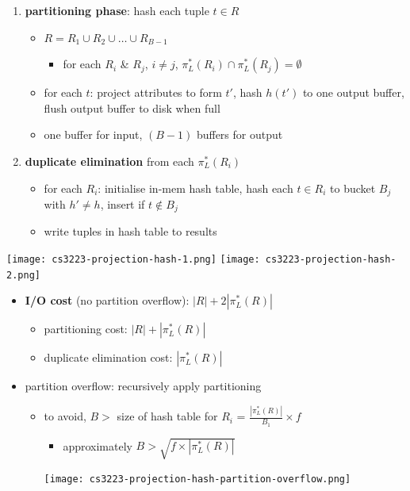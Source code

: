 \documentclass[10pt, landscape]{article}
\begin{document}
\begin{multicols*}{4}
  \begin{enumerate}
    \item \textbf{partitioning phase}: hash each tuple $t \in R$ 
      \begin{itemize}
        \item $R = R_1 \cup R_2 \cup \dots \cup R_{B-1}$
          \begin{itemize}
            \item for each $R_i$ \& $R_j$, $i \neq j$, $\pi_L^*(R_i) \cap \pi_L^*(R_j) = \emptyset$
          \end{itemize}
        \item for each $t$: project attributes to form $t'$, hash $h(t')$ to one output buffer, flush output buffer to disk when full
        \item one buffer for input, $(B-1)$ buffers for output
      \end{itemize}
    \item \textbf{duplicate elimination} from each $\pi^*_L(R_i)$
      \begin{itemize}
        \item for each $R_i$: initialise in-mem hash table, hash each $t \in R_i$ to bucket $B_j$ with $h' \neq h$, insert if $t \not\in B_j$
        \item write tuples in hash table to results
      \end{itemize}
  \end{enumerate}
  \texttt{[image: cs3223-projection-hash-1.png]} 
  \texttt{[image: cs3223-projection-hash-2.png]} 

  \begin{itemize}
    \item \textbf{I/O cost} (no partition overflow): $|R| + 2|\pi^*_L(R)|$
      \begin{itemize}
        \item partitioning cost: $|R| + |\pi^*_L(R)|$
        \item duplicate elimination cost: $|\pi^*_L(R)|$
      \end{itemize}
    \item partition overflow: recursively apply partitioning
      \begin{itemize}
        \item to avoid, $B>$ size of hash table for $R_i$ = $\frac{|\pi^*_L(R)|}{B_1} \times f$
          \begin{itemize}
            \item  approximately $B> \sqrt{f\times |\pi^*_L(R)|}$
          \end{itemize}
          \texttt{[image: cs3223-projection-hash-partition-overflow.png]} 
      \end{itemize}
  \end{itemize}


\end{multicols*}
\end{document}

